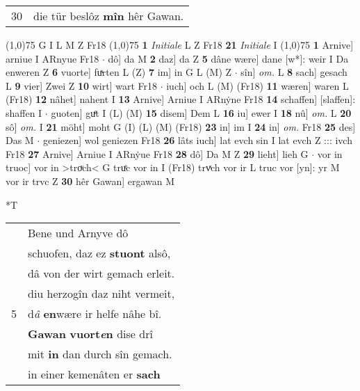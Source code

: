 \documentclass[8pt,a4paper,notitlepage]{article}
\begin{document}
\begin{table}[ht]
\begin{minipage}[t]{0.5\linewidth}
\begin{tabular}{rl}
30 & die tür beslôz \textbf{mîn} hêr Gawan.\\ 
\end{tabular}
\scriptsize
\line(1,0){75} \newline
G I L M Z Fr18 \newline
\line(1,0){75} \newline
\textbf{1} \textit{Initiale} L Z Fr18  \textbf{21} \textit{Initiale} I  \newline
\line(1,0){75} \newline
\textbf{1} Arnive] arniue I ARnyue Fr18  $\cdot$ dô] da M \textbf{2} daz] da Z \textbf{5} dâne wære] dane [w*]: weir I Da enweren Z \textbf{6} vuorte] fuͯrten L (Z) \textbf{7} im] in G L (M) Z  $\cdot$ sîn] \textit{om.} L \textbf{8} sach] gesach L \textbf{9} vier] Zwei Z \textbf{10} wirt] wart Fr18  $\cdot$ iuch] och L (M) (Fr18) \textbf{11} wæren] waren L (Fr18) \textbf{12} nâhet] nahent I \textbf{13} Arnive] Arniue I ARnẏne Fr18 \textbf{14} schaffen] [slaffen]: shaffen I  $\cdot$ guoten] guͤt I (L) (M) \textbf{15} disem] Dem L \textbf{16} iu] ewer I \textbf{18} nû] \textit{om.} L \textbf{20} sô] \textit{om.} I \textbf{21} möht] moht G (I) (L) (M) (Fr18) \textbf{23} in] im I \textbf{24} in] \textit{om.} Fr18 \textbf{25} des] Das M  $\cdot$ geniezen] wol geniezen Fr18 \textbf{26} lâts iuch] lat evch sin I lat evch Z ::: ivch Fr18 \textbf{27} Arnive] Arniue I ARnẏue Fr18 \textbf{28} dô] Da M Z \textbf{29} lieht] lieh G  $\cdot$ vor in truoc] vor in >troͮch< G truͤc vor in I (Fr18) trvͯch vor ir L truc vor [yn]: yr M vor ir trvc Z \textbf{30} hêr Gawan] ergawan M \newline
\end{minipage}
\hspace{0.5cm}
\begin{minipage}[t]{0.5\linewidth}
\small
\begin{center}*T
\end{center}
\begin{tabular}{rl}
 & Bene und Arnyve dô\\ 
 & schuofen, daz ez \textbf{stuont} alsô,\\ 
 & dâ von der wirt gemach erleit.\\ 
 & diu herzogîn daz niht vermeit,\\ 
5 & d\textit{â} \textbf{en}wære ir helfe nâhe bî.\\ 
 & \textbf{Gawan} \textbf{vuort\textit{e}n} dise drî\\ 
 & mit \textbf{in} dan durch sîn gemach.\\ 
 & in einer kemenâten er \textbf{sach}\\ 

\end{tabular}
\end{minipage}
\end{table}
\end{document}
